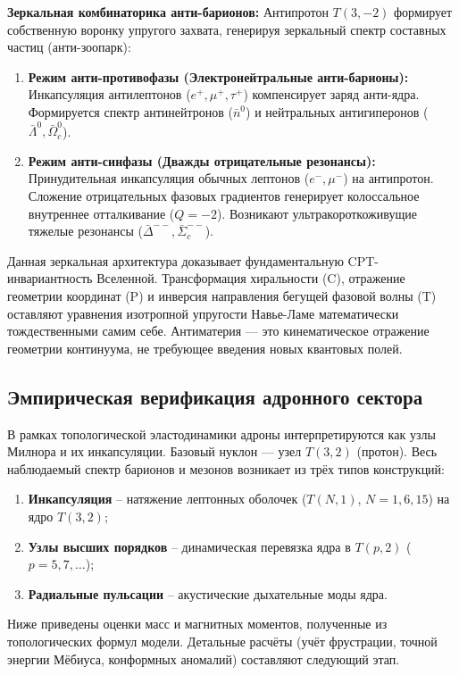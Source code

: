 \documentclass[11pt,a4paper]{article}
\begin{document}
	\textbf{Зеркальная комбинаторика анти-барионов:}
	Антипротон $T(3,-2)$ формирует собственную воронку упругого захвата, генерируя зеркальный спектр составных частиц (анти-зоопарк):
	\begin{enumerate}
		\item \textbf{Режим анти-противофазы (Электронейтральные анти-барионы):} Инкапсуляция антилептонов ($e^+, \mu^+, \tau^+$) компенсирует заряд анти-ядра. Формируется спектр антинейтронов ($\bar{n}^0$) и нейтральных антигиперонов ($\bar{\Lambda}^0, \bar{\Omega}_c^0$).
		\item \textbf{Режим анти-синфазы (Дважды отрицательные резонансы):} Принудительная инкапсуляция обычных лептонов ($e^-, \mu^-$) на антипротон. Сложение отрицательных фазовых градиентов генерирует колоссальное внутреннее отталкивание ($Q=-2$). Возникают ультракороткоживущие тяжелые резонансы ($\bar{\Delta}^{--}, \bar{\Sigma}_c^{--}$).
	\end{enumerate}
	
	Данная зеркальная архитектура доказывает фундаментальную CPT-инвариантность Вселенной. Трансформация хиральности (C), отражение геометрии координат (P) и инверсия направления бегущей фазовой волны (T) оставляют уравнения изотропной упругости Навье-Ламе математически тождественными самим себе. Антиматерия — это кинематическое отражение геометрии континуума, не требующее введения новых квантовых полей.

\subsection{Эмпирическая верификация адронного сектора}
\label{sec:hadron_verification}

В рамках топологической эластодинамики адроны интерпретируются как узлы Милнора и их инкапсуляции. Базовый нуклон — узел $T(3,2)$ (протон). Весь наблюдаемый спектр барионов и мезонов возникает из трёх типов конструкций:
\begin{enumerate}
\item \textbf{Инкапсуляция} – натяжение лептонных оболочек ($T(N,1)$, $N=1,6,15$) на ядро $T(3,2)$;
\item \textbf{Узлы высших порядков} – динамическая перевязка ядра в $T(p,2)$ ($p=5,7,\dots$);
\item \textbf{Радиальные пульсации} – акустические дыхательные моды ядра.
\end{enumerate}
Ниже приведены оценки масс и магнитных моментов, полученные из топологических формул модели. Детальные расчёты (учёт фрустрации, точной энергии Мёбиуса, конформных аномалий) составляют следующий этап.
\end{document}
